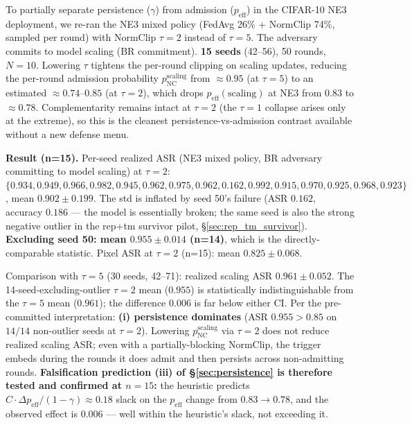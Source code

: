 \documentclass{article}
\begin{document}
To partially separate persistence ($\gamma$) from admission ($p_{\mathrm{eff}}$) in the CIFAR-10 NE3 deployment, we re-ran the NE3 mixed policy (FedAvg 26\% + NormClip 74\%, sampled per round) with NormClip $\tau{=}2$ instead of $\tau{=}5$. The adversary commits to model scaling (BR commitment). \textbf{15 seeds} (42--56), 50 rounds, $N{=}10$. Lowering $\tau$ tightens the per-round clipping on scaling updates, reducing the per-round admission probability $p^{\mathrm{scaling}}_{\mathrm{NC}}$ from ${\approx}0.95$ (at $\tau{=}5$) to an estimated ${\approx}0.74$--$0.85$ (at $\tau{=}2$), which drops $p_{\mathrm{eff}}(\mathrm{scaling})$ at NE3 from $0.83$ to ${\approx}0.78$. Complementarity remains intact at $\tau{=}2$ (the $\tau{=}1$ collapse arises only at the extreme), so this is the cleanest persistence-vs-admission contrast available without a new defense menu.

\textbf{Result (n=15).} Per-seed realized ASR (NE3 mixed policy, BR adversary committing to model scaling) at $\tau{=}2$: $\{0.934, 0.949, 0.966, 0.982, 0.945, 0.962, 0.975, 0.962, 0.162, 0.992, 0.915, 0.970, 0.925, 0.968, 0.923\}$, mean $\mathbf{0.902 \pm 0.199}$. The std is inflated by seed 50's failure (ASR $0.162$, accuracy $0.186$ --- the model is essentially broken; the same seed is also the strong negative outlier in the rep+tm survivor pilot, §\ref{sec:rep_tm_survivor}). \textbf{Excluding seed 50: mean $0.955 \pm 0.014$ (n=14)}, which is the directly-comparable statistic. Pixel ASR at $\tau{=}2$ (n=15): mean $0.825 \pm 0.068$.

Comparison with $\tau{=}5$ (30 seeds, 42--71): realized scaling ASR $0.961 \pm 0.052$. The 14-seed-excluding-outlier $\tau{=}2$ mean ($0.955$) is statistically indistinguishable from the $\tau{=}5$ mean ($0.961$); the difference $0.006$ is far below either CI. Per the pre-committed interpretation: \textbf{(i) persistence dominates} (ASR $0.955 > 0.85$ on $14/14$ non-outlier seeds at $\tau{=}2$). Lowering $p_{\mathrm{NC}}^{\mathrm{scaling}}$ via $\tau{=}2$ does not reduce realized scaling ASR; even with a partially-blocking NormClip, the trigger embeds during the rounds it does admit and then persists across non-admitting rounds. \textbf{Falsification prediction (iii) of §\ref{sec:persistence} is therefore tested and confirmed at $n{=}15$:} the heuristic predicts $C \cdot \Delta p_{\mathrm{eff}} / (1-\gamma) \approx 0.18$ slack on the $p_{\mathrm{eff}}$ change from $0.83 \to 0.78$, and the observed effect is $0.006$ --- well within the heuristic's slack, not exceeding it.
\end{document}

